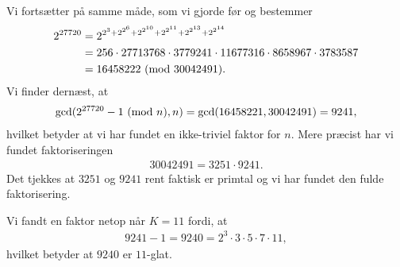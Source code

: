 \begin{example}
Vi fortsætter på samme måde, som vi gjorde før og bestemmer
\begin{align*}
	2^{27720} &= 2^{2^3 + 2^{2^6} + 2^{2^{10}} + 2^{2^{11}} + 2^{2^{13}} + 2^{2^{14}}} \\
	&= 256 \cdot 27713768 \cdot 3779241 \cdot 11677316 \cdot 8658967 \cdot 3783587 \\
	&= 16458222 \ (\mathrm{mod} \ 30042491).
\end{align*}
Vi finder dernæst, at
\begin{align*}
	\gcd(2^{27720} - 1 \ (\mathrm{mod} \ n), n) = \gcd(16458221, 30042491) = 9241,
\end{align*}
hvilket betyder at vi har fundet en ikke-triviel faktor for $n$. Mere præcist har vi fundet faktoriseringen
\begin{align*}
	30042491 = 3251 \cdot 9241.
\end{align*}
Det tjekkes at $3251$ og $9241$ rent faktisk er primtal og vi har fundet den fulde faktorisering.
\end{example}
\begin{remark}
Vi fandt en faktor netop når $K=11$ fordi, at 
\begin{align*}
	9241 - 1 = 9240 = 2^3 \cdot 3 \cdot 5 \cdot 7 \cdot 11,
\end{align*}
hvilket betyder at $9240$ er $11$-glat.
\end{remark}